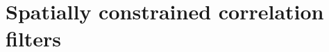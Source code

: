 \documentclass[twocolumn]{article}
\begin{document}
\section{Spatially constrained correlation filters} \label{sec:approach}

\begin{comment}


A standard correlation filter tracker is improved with the novel constrained filter learning method which identifies and focuses to the most reliable parts of the correlation filter. \hl{The filter is calculated by efficiently solving the constrained optimization described in the }Section~\ref{sec:constrained_learning}. The most reliable parts of the filter are identified by introducing the spatial reliability map (Section~\ref{sec:spatial_prior}). Furthermore, the method for channel reliability estimation is presented in Section~\ref{sec:chan_reliab}. The proposed tracker is described in Section~\ref{sec:tracking_framework}. 

Given a set of  channel features  and corresponding target templates (filters) , where ,  (channel width and height are denoted as  and , respectively), the object position  is estimated by maximizing the probability 

The density  is a convolution of a feature map with a learned template evaluated at  and  is a prior reflecting the channel reliability.



\hl{We assume independent feature channels, therefore optimal filters are obtained} at learning stage by minimizing the sum of squared differences between the channel-wise correlation outputs and the desired output ,

The equivalence in (\ref{eq:mosse}) follows from the Parsevaal's theorem, the operator  is a Fourier  transform of  reshaped into a column vector i.e., , with ,  forms a  diagonal matrix from  and  is a Hermitian transpose. Minimization of (\ref{eq:mosse}) has a closed-form solution by equating the complex gradient of (\ref{eq:mosse}) w.r.t. each channel to zero~\citep{bolme2010visual}. Despite its simplicity, this solution suffers from boundary defects due to input circularity assumption and from assuming all pixels are equally reliable for filter learning. In the following we address this issue by proposing an efficient spatial reliability map construction for correlation filters and propose a new spatially constrained correlation filter learning framework.
\end{comment} 
\end{document}
